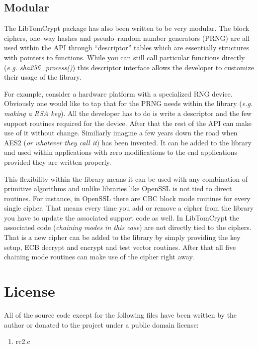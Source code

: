 \documentclass[a4paper]{book}
\begin{document}
\subsection{Modular}
The LibTomCrypt package has also been written to be very modular.  The block ciphers, one--way hashes and
pseudo--random number generators (PRNG) are all used within the API through ``descriptor'' tables which 
are essentially structures with pointers to functions.  While you can still call particular functions
directly (\textit{e.g. sha256\_process()}) this descriptor interface allows the developer to customize their
usage of the library.

For example, consider a hardware platform with a specialized RNG device.  Obviously one would like to tap
that for the PRNG needs within the library (\textit{e.g. making a RSA key}).  All the developer has to do
is write a descriptor and the few support routines required for the device.  After that the rest of the 
API can make use of it without change.  Similiarly imagine a few years down the road when AES2 
(\textit{or whatever they call it}) has been invented.  It can be added to the library and used within applications 
with zero modifications to the end applications provided they are written properly.

This flexibility within the library means it can be used with any combination of primitive algorithms and 
unlike libraries like OpenSSL is not tied to direct routines.  For instance, in OpenSSL there are CBC block
mode routines for every single cipher.  That means every time you add or remove a cipher from the library
you have to update the associated support code as well.  In LibTomCrypt the associated code (\textit{chaining modes in this case})
are not directly tied to the ciphers.  That is a new cipher can be added to the library by simply providing 
the key setup, ECB decrypt and encrypt and test vector routines.  After that all five chaining mode routines
can make use of the cipher right away.

\section{License}

All of the source code except for the following files have been written by the author or donated to the project
under a public domain license:

\begin{enumerate}
   \item rc2.c
\end{enumerate}
\end{document}
